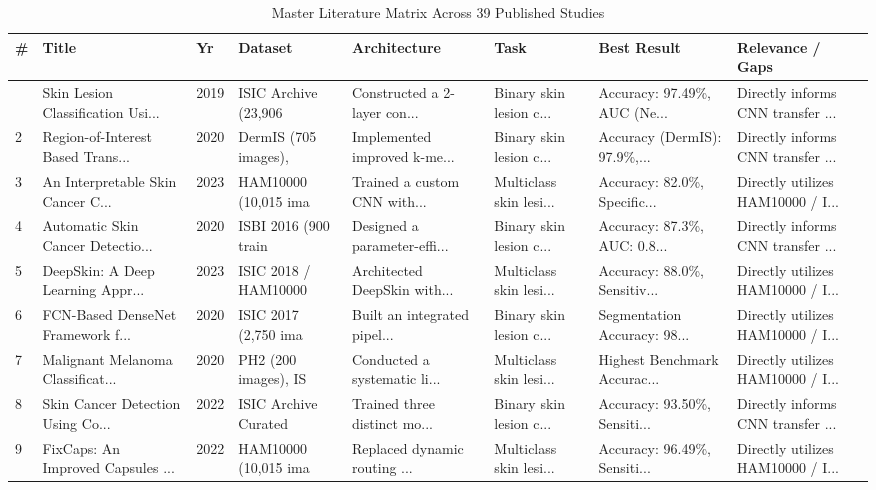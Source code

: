 \documentclass[11pt,a4paper]{article}
\begin{document}
\begin{small}
\begin{longtable}{p{0.5cm} p{2.2cm} p{0.8cm} p{1.8cm} p{2.0cm} p{2.0cm} p{2.0cm} p{2.5cm}}
\caption{Master Literature Matrix Across 39 Published Studies} \label{tab:lit_matrix} \\
\toprule
\textbf{\#} & \textbf{Title} & \textbf{Yr} & \textbf{Dataset} & \textbf{Architecture} & \textbf{Task} & \textbf{Best Result} & \textbf{Relevance / Gaps} \\
\midrule
\endhead
\bottomrule
\endfoot
1 & Skin Lesion Classification Usi... & 2019 & ISIC Archive (23,906 & Constructed a 2-layer con... & Binary skin lesion c... & Accuracy: 97.49\%, AUC (Ne... & Directly informs CNN transfer ... \\
2 & Region-of-Interest Based Trans... & 2020 & DermIS (705 images), & Implemented improved k-me... & Binary skin lesion c... & Accuracy (DermIS): 97.9\%,... & Directly informs CNN transfer ... \\
3 & An Interpretable Skin Cancer C... & 2023 & HAM10000 (10,015 ima & Trained a custom CNN with... & Multiclass skin lesi... & Accuracy: 82.0\%, Specific... & Directly utilizes HAM10000 / I... \\
4 & Automatic Skin Cancer Detectio... & 2020 & ISBI 2016 (900 train & Designed a parameter-effi... & Binary skin lesion c... & Accuracy: 87.3\%, AUC: 0.8... & Directly informs CNN transfer ... \\
5 & DeepSkin: A Deep Learning Appr... & 2023 & ISIC 2018 / HAM10000 & Architected DeepSkin with... & Multiclass skin lesi... & Accuracy: 88.0\%, Sensitiv... & Directly utilizes HAM10000 / I... \\
6 & FCN-Based DenseNet Framework f... & 2020 & ISIC 2017 (2,750 ima & Built an integrated pipel... & Binary skin lesion c... & Segmentation Accuracy: 98... & Directly utilizes HAM10000 / I... \\
7 & Malignant Melanoma Classificat... & 2020 & PH2 (200 images), IS & Conducted a systematic li... & Multiclass skin lesi... & Highest Benchmark Accurac... & Directly utilizes HAM10000 / I... \\
8 & Skin Cancer Detection Using Co... & 2022 & ISIC Archive Curated & Trained three distinct mo... & Binary skin lesion c... & Accuracy: 93.50\%, Sensiti... & Directly informs CNN transfer ... \\
9 & FixCaps: An Improved Capsules ... & 2022 & HAM10000 (10,015 ima & Replaced dynamic routing ... & Multiclass skin lesi... & Accuracy: 96.49\%, Sensiti... & Directly utilizes HAM10000 / I... \\

\end{longtable}
\end{small}
\end{document}
